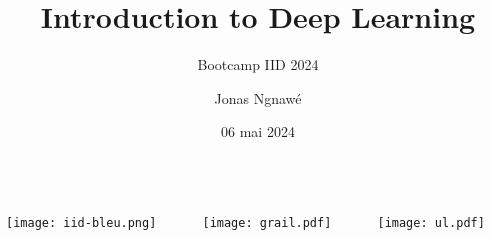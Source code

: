 \documentclass[english,usenames,dvipsnames]{beamer}
\title[]{Introduction to Deep Learning}
\subtitle{Bootcamp IID 2024}
\author[J. Ngnawé]{Jonas Ngnawé}
\institute{\texttt{\{jonas.ngnawe.1\}@ulaval.ca}}
\date[]{06 mai 2024}
\begin{document}
\begin{frame}[nonum]
\titlepage
\begin{center}
	\vspace{-10mm}
	\begin{columns}
		\begin{column}{0.33\textwidth}
			\texttt{[image: iid-bleu.png]}
		\end{column}
		\begin{column}{0.33\textwidth}
			\texttt{[image: grail.pdf]}
		\end{column}
		\begin{column}{0.33\textwidth}
			\hspace{-5mm}
			\texttt{[image: ul.pdf]}
		\end{column}
	\end{columns}
\end{center}
\end{frame}

\begin{frame}[nonum]
	\tableofcontents[subsubsectionstyle=hide/hide]
\end{frame}
\end{document}

